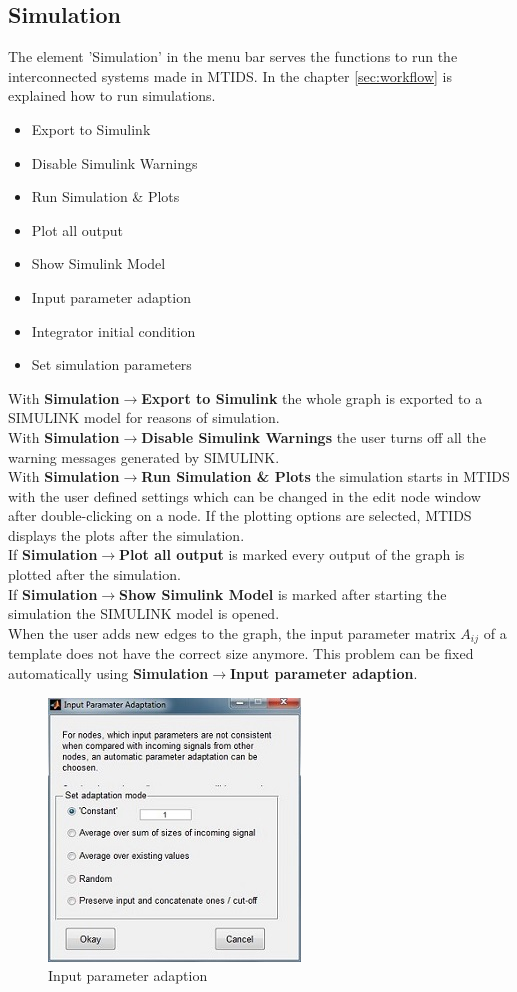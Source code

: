 \documentclass[12pt]{report}
\begin{document}
\subsection{Simulation}
\label{subsec:simulation}
The element 'Simulation' in the menu bar serves the functions to run the interconnected systems made in MTIDS. In the chapter \ref{sec:workflow} is explained how to run simulations.\\
\begin{itemize}
	\item Export to Simulink
	\item Disable Simulink Warnings
	\item Run Simulation \& Plots
	\item Plot all output
	\item Show Simulink Model
	\item Input parameter adaption
	\item Integrator initial condition
	\item Set simulation parameters
\end{itemize}
With \textbf{Simulation$\rightarrow$Export to Simulink} the whole graph is exported to a SIMULINK model for reasons of simulation.\\
With \textbf{Simulation$\rightarrow$Disable Simulink Warnings} the user turns off all the warning messages generated by SIMULINK.\\
With \textbf{Simulation$\rightarrow$Run Simulation \& Plots} the simulation starts in MTIDS with the user defined settings which can be changed in the edit node window after double-clicking on a node. If the plotting options are selected, MTIDS displays the plots after the simulation.\\
If \textbf{Simulation$\rightarrow$Plot all output} is marked every output of the graph is plotted after the simulation.\\
If \textbf{Simulation$\rightarrow$Show Simulink Model} is marked after starting the simulation the SIMULINK model is opened.\\
When the user adds new edges to the graph, the input parameter matrix $A_{ij}$ of a template does not have the correct size anymore. This problem can be fixed automatically using \textbf{Simulation$\rightarrow$Input parameter adaption}.\\
\begin{figure}[h]
\centering
\includegraphics[scale=.9]{inputpara}
\caption{Input parameter adaption}
\label{FIG:abb20}
\end{figure}
\end{document}

